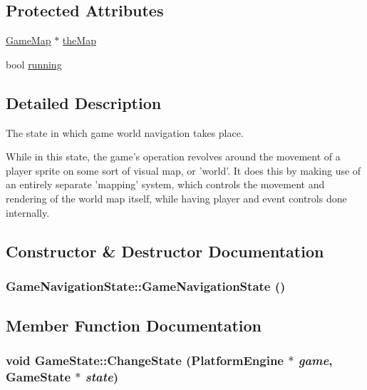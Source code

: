 \subsection*{Protected Attributes}
\begin{CompactItemize}
\item 
\hyperlink{class_game_map}{GameMap} $\ast$ \hyperlink{class_game_navigation_state_83154f9523275696f30c13447e1d74f3}{theMap}
\item 
bool \hyperlink{class_game_state_391df04a740c7480270d3c71a578b43a}{running}
\end{CompactItemize}


\subsection{Detailed Description}
The state in which game world navigation takes place. 

While in this state, the game's operation revolves around the movement of a player sprite on some sort of visual map, or 'world'. It does this by making use of an entirely separate 'mapping' system, which controls the movement and rendering of the world map itself, while having player and event controls done internally. 

\subsection{Constructor \& Destructor Documentation}
\hypertarget{class_game_navigation_state_6a3b93831c85eb5dc3de0a53ca13ddfc}{
\subsubsection[{GameNavigationState}]{\setlength{\rightskip}{0pt plus 5cm}GameNavigationState::GameNavigationState ()}}
\label{de/d2a/class_game_navigation_state_6a3b93831c85eb5dc3de0a53ca13ddfc}




\subsection{Member Function Documentation}
\hypertarget{class_game_state_f786aeb704a22a135dc289bb89fcc452}{
\subsubsection[{ChangeState}]{\setlength{\rightskip}{0pt plus 5cm}void GameState::ChangeState ({\bf PlatformEngine} $\ast$ {\em game}, \/  {\bf GameState} $\ast$ {\em state})}}
\label{dd/d87/class_game_state_f786aeb704a22a135dc289bb89fcc452}


